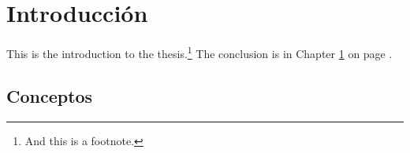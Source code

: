 \chapter{Introducción}
\label{chap:cap1}

This is the introduction to the thesis.\footnote{And this is a footnote.}  The conclusion is in Chapter \ref{chap:cap1} on page \pageref{chap:cap1}.

\section{Conceptos}



